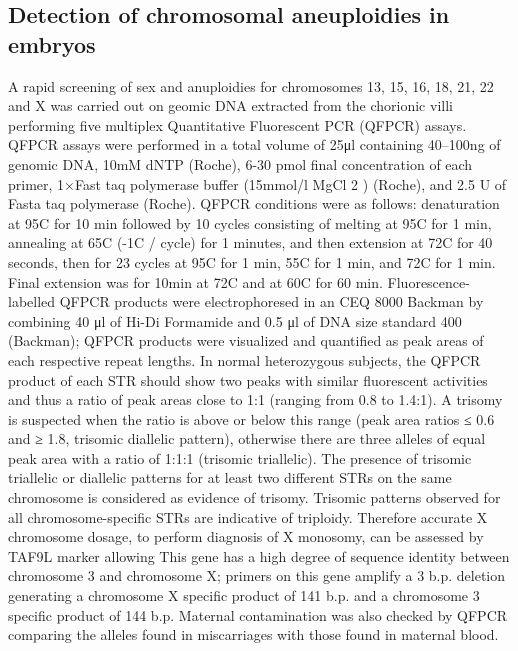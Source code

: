 \subsection*{Detection of chromosomal aneuploidies in embryos} 
A rapid screening of sex and anuploidies for chromosomes 13, 15, 16, 18, 21, 22 and X was carried out on geomic DNA extracted from the chorionic villi performing five multiplex Quantitative Fluorescent PCR (QFPCR) assays. QFPCR assays were performed in a total volume of 25μl containing 40–100ng of genomic DNA, 10mM dNTP (Roche), 6-30 pmol final concentration of each primer, 1×Fast taq polymerase buffer (15mmol/l MgCl 2 ) (Roche), and 2.5 U of Fasta taq polymerase (Roche). QFPCR conditions were as follows: denaturation at 95\textdegree C for 10 min followed by 10 cycles consisting of melting at 95\textdegree C for 1 min, annealing at 65\textdegree C (-1\textdegree C / cycle) for 1 minutes, and then extension at 72\textdegree C for 40 seconds, then for 23 cycles at 95\textdegree C for 1 min, 55\textdegree C for 1 min, and 72\textdegree C for 1 min. Final extension was for 10min at 72\textdegree C and at 60\textdegree C for 60 min. Fluorescence-labelled QFPCR products were electrophoresed in an CEQ 8000 Backman by combining 40 μl of Hi-Di Formamide and 0.5 μl of DNA size standard 400 (Backman); QFPCR products were visualized and quantified as peak areas of each respective repeat lengths. In normal heterozygous subjects, the QFPCR product of each STR should show two peaks with similar fluorescent activities and thus a ratio of peak areas close to 1:1 (ranging from 0.8 to 1.4:1). A trisomy is suspected when the ratio is  above or below this range (peak area ratios ≤ 0.6 and ≥ 1.8, trisomic diallelic pattern), otherwise there are three alleles of equal peak area with a ratio of 1:1:1 (trisomic triallelic). The presence of trisomic triallelic or diallelic patterns for at least two different STRs on the same chromosome is considered as evidence of trisomy. Trisomic patterns observed for all chromosome-specific STRs are indicative of triploidy. Therefore accurate X chromosome dosage, to perform diagnosis of X monosomy, can be assessed by TAF9L marker allowing This gene has a high degree of sequence identity between chromosome 3 and chromosome X; primers on this gene amplify a 3 b.p. deletion generating a chromosome X specific product of 141 b.p. and a chromosome 3 specific product of 144 b.p. Maternal contamination was also checked by QFPCR comparing the alleles found in miscarriages with those found in maternal blood. %


